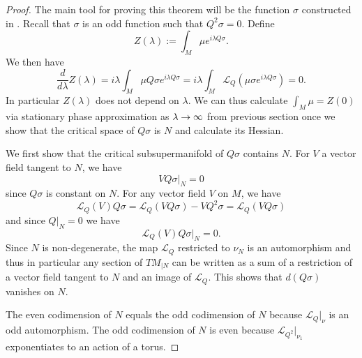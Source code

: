 \documentclass[11pt]{amsart}
\numberwithin{equation}{section}
\numberwithin{figure}{section}
\theoremstyle{plain}
\theoremstyle{definition}
\theoremstyle{remark}
\begin{document}
\begin{proof}
The main tool for proving this theorem will be the function $\sigma$
constructed in . Recall that $\sigma$ is
an odd function such that $Q^{2}\sigma=0$. Define 
\[
Z(\lambda):=\int_{M}\mu e^{i\lambda Q\sigma}.
\]
We then have 
\[
\frac{d}{d\lambda}Z(\lambda)=i\lambda\int_{M}\mu Q\sigma e^{i\lambda Q\sigma}=i\lambda\int_{M}\mathcal{L}_{Q}(\mu\sigma e^{i\lambda Q\sigma})=0.
\]
In particular $Z(\lambda)$ does not depend on $\lambda$. We can
thus calculate $\int_{M}\mu=Z(0)$ via stationary phase approximation
as $\lambda\rightarrow\infty$ from previous section once we show that the critical
space of $Q\sigma$ is $N$ and calculate its Hessian.

We first show that the critical subsupermanifold of $Q\sigma$ contains
$N$. For $V$ a vector field tangent to $N$, we have 
\[
VQ\sigma|_{N}=0
\]
since $Q\sigma$ is constant on $N$. For any vector field $V$ on
$M$, we have 
\[
\mathcal{L}_{Q}(V)Q\sigma=\mathcal{L}_{Q}(VQ\sigma)-VQ^{2}\sigma=\mathcal{L}_{Q}(VQ\sigma)
\]
and since $Q|_{N}=0$ we have 
\[
\mathcal{L}_{Q}(V)Q\sigma|_{N}=0.
\]
Since $N$ is non-degenerate, the map $\mathcal{L}_{Q}$ restricted
to $\nu_{N}$ is an automorphism and thus in particular any section
of $TM_{|N}$ can be written as a sum of a restriction of a vector
field tangent to $N$ and an image of $\mathcal{L}_{Q}$. This shows
that $d(Q\sigma)$ vanishes on $N$.

The even codimension of $N$ equals the odd codimension of $N$ because
$\mathcal{L}_{Q}|_{\nu}$ is an odd automorphism. The odd codimension
of $N$ is even because $\mathcal{L}_{Q^{2}}|_{\nu_{1}}$ exponentiates
to an action of a torus.


\end{proof}
\end{document}
